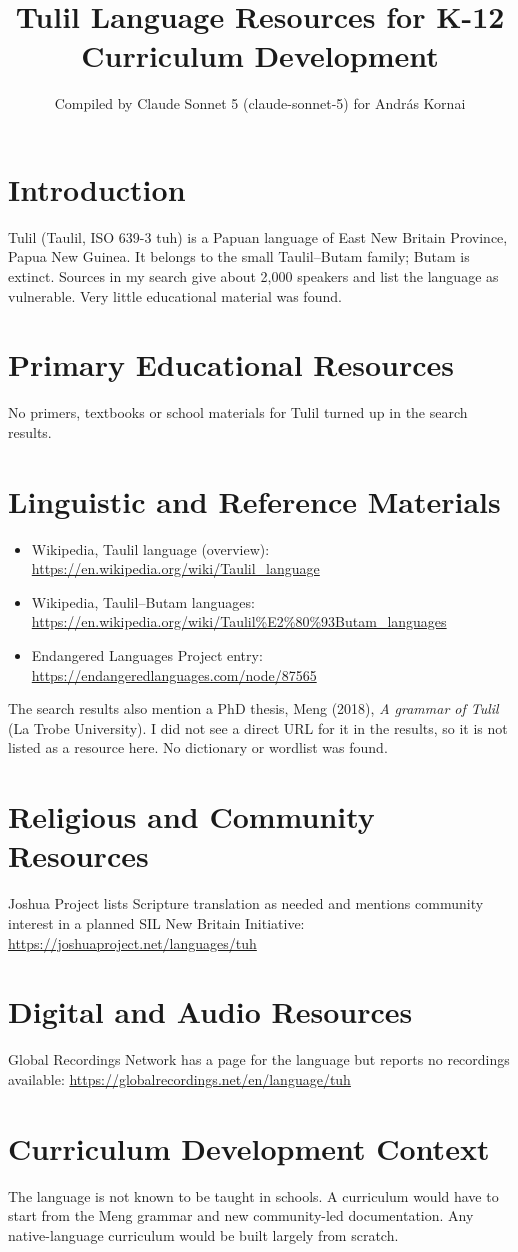\documentclass[12pt]{article}
\title{Tulil Language Resources for K-12 Curriculum Development}
\author{Compiled by Claude Sonnet 5 (claude-sonnet-5) for Andr\'as Kornai}
\date{}
\begin{document}
\maketitle
\section{Introduction}
Tulil (Taulil, ISO 639-3 tuh) is a Papuan language of East New Britain Province, Papua New Guinea. It belongs to the small Taulil--Butam family; Butam is extinct. Sources in my search give about 2,000 speakers and list the language as vulnerable. Very little educational material was found.
\section{Primary Educational Resources}
No primers, textbooks or school materials for Tulil turned up in the search results.
\section{Linguistic and Reference Materials}
\begin{itemize}
\item Wikipedia, Taulil language (overview): \url{https://en.wikipedia.org/wiki/Taulil_language}
\item Wikipedia, Taulil--Butam languages: \url{https://en.wikipedia.org/wiki/Taulil%E2%80%93Butam_languages}
\item Endangered Languages Project entry: \url{https://endangeredlanguages.com/node/87565}
\end{itemize}
The search results also mention a PhD thesis, Meng (2018), \emph{A grammar of Tulil} (La Trobe University). I did not see a direct URL for it in the results, so it is not listed as a resource here. No dictionary or wordlist was found.
\section{Religious and Community Resources}
Joshua Project lists Scripture translation as needed and mentions community interest in a planned SIL New Britain Initiative: \url{https://joshuaproject.net/languages/tuh}
\section{Digital and Audio Resources}
Global Recordings Network has a page for the language but reports no recordings available: \url{https://globalrecordings.net/en/language/tuh}
\section{Curriculum Development Context}
The language is not known to be taught in schools. A curriculum would have to start from the Meng grammar and new community-led documentation. Any native-language curriculum would be built largely from scratch.
\end{document}
